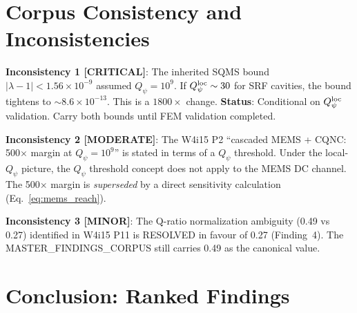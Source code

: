\documentclass[11pt]{article}
\newcommand{\lam}{\lambda}
\newcommand{\ee}[1]{\times 10^{#1}}
\newcommand{\lbone}{|\lam - 1|}
\theoremstyle{definition}
\theoremstyle{remark}
\begin{document}
\part{Corpus Consistency and Inconsistencies}
\label{part:consistency}

\begin{tcolorbox}[colback=red!5!white, colframe=red!60!black,
  title=\textbf{INCONSISTENCY WITH INHERITED STATE}]

\textbf{Inconsistency 1 [CRITICAL]}: The inherited SQMS bound
$\lbone < 1.56\ee{-9}$ assumed $Q_\psi = 10^9$. If $Q_\psi^{\rm loc}
\sim 30$ for SRF cavities, the bound tightens to $\sim 8.6\ee{-13}$.
This is a $1800\times$ change. \textbf{Status}: Conditional on
$Q_\psi^{\rm loc}$ validation. Carry both bounds until FEM validation
completed.

\textbf{Inconsistency 2 [MODERATE]}: The W4i15 P2 ``cascaded MEMS
+ CQNC: 500$\times$ margin at $Q_\psi = 10^9$'' is stated in terms
of a $Q_\psi$ threshold. Under the local-$Q_\psi$ picture, the
$Q_\psi$ threshold concept does not apply to the MEMS DC channel.
The 500$\times$ margin is \emph{superseded} by a direct sensitivity
calculation (Eq.~\ref{eq:mems_reach}).

\textbf{Inconsistency 3 [MINOR]}: The Q-ratio normalization ambiguity
(0.49 vs 0.27) identified in W4i15 P11 is RESOLVED in favour of 0.27
(Finding~4). The MASTER\_FINDINGS\_CORPUS still carries 0.49 as the
canonical value.

\end{tcolorbox}


\part{Conclusion: Ranked Findings}
\label{part:conclusion}
\end{document}

